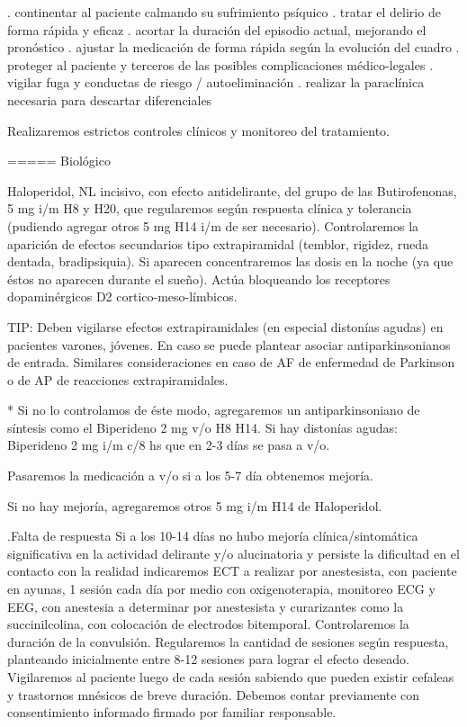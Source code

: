 \documentclass{scrbook}
\begin{document}
. continentar al paciente calmando su sufrimiento psíquico
. tratar el delirio de forma rápida y eficaz
. acortar la duración del episodio actual, mejorando el pronóstico
. ajustar la medicación de forma rápida según la evolución del cuadro
. proteger al paciente y terceros de las posibles complicaciones médico-legales
. vigilar fuga y conductas de riesgo / autoeliminación
. realizar la paraclínica necesaria para descartar diferenciales

Realizaremos estrictos controles clínicos y monitoreo del tratamiento.

===== Biológico

Haloperidol, NL incisivo, con efecto antidelirante, del grupo de las Butirofenonas, 5 mg i/m H8 y H20, que regularemos según respuesta clínica y tolerancia (pudiendo agregar otros 5 mg H14 i/m de ser necesario). Controlaremos la aparición de efectos secundarios tipo extrapiramidal (temblor, rigidez, rueda dentada, bradipsiquia). Si aparecen concentraremos las dosis en la noche (ya que éstos no aparecen durante el sueño).
Actúa bloqueando los receptores dopaminérgicos D2 cortico-meso-límbicos.

TIP: Deben vigilarse efectos extrapiramidales (en especial distonías agudas) en pacientes varones, jóvenes. En caso se puede plantear asociar antiparkinsonianos de entrada. Similares consideraciones en caso de AF de enfermedad de Parkinson o de AP de reacciones extrapiramidales.

* Si no lo controlamos de éste modo, agregaremos un antiparkinsoniano de síntesis como el Biperideno 2 mg v/o H8 H14. Si hay distonías agudas: Biperideno 2 mg i/m c/8 hs que en 2-3 días se pasa a v/o.

Pasaremos la medicación a v/o si a los 5-7 día obtenemos mejoría.

Si no hay mejoría, agregaremos otros 5 mg i/m H14 de Haloperidol.

.Falta de respuesta
Si a los 10-14 días no hubo mejoría clínica/sintomática significativa en la actividad delirante y/o alucinatoria y persiste la dificultad en el contacto con la realidad indicaremos ECT a realizar por anestesista, con paciente en ayunas, 1 sesión cada día por medio con oxigenoterapia, monitoreo ECG y EEG, con anestesia a determinar por anestesista y curarizantes como la succinilcolina, con colocación de electrodos bitemporal. Controlaremos la duración de la convulsión. Regularemos la cantidad de sesiones según respuesta, planteando inicialmente entre 8-12 sesiones para lograr el efecto deseado. Vigilaremos al paciente luego de cada sesión sabiendo que pueden existir cefaleas y trastornos mnésicos de breve duración. Debemos contar previamente con consentimiento informado firmado por familiar responsable.
\end{document}
